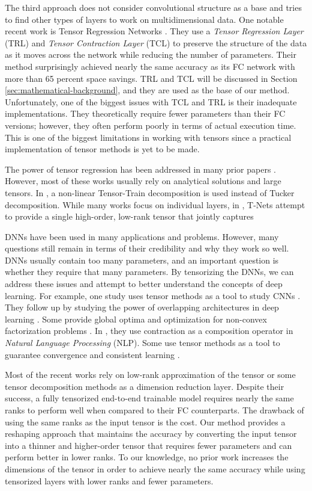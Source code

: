 \documentclass{article}
\begin{document}
The third approach does not consider convolutional structure as a base and tries to find other types of layers to work on multidimensional data. One notable recent work is Tensor Regression Networks \cite{r1}. They use a \textit{Tensor Regression Layer} (TRL) and \textit{Tensor Contraction Layer} (TCL) to preserve the structure of the data as it moves across the network while reducing the number of parameters. Their method surprisingly achieved nearly the same accuracy as its FC network with more than 65 percent space savings. TRL and TCL will be discussed in Section \ref{sec:mathematical-background}, and they are used as the base of our method. Unfortunately, one of the biggest issues with TCL and TRL is their inadequate implementations. They theoretically require fewer parameters than their FC versions; however, they often perform poorly in terms of actual execution time. This is one of the biggest limitations in working with tensors since a practical implementation of tensor methods is yet to be made.

The power of tensor regression has been addressed in many prior papers \cite{r17, r18, r19, r20}. However, most of these works usually rely on analytical solutions and large tensors. In \cite{r33}, a non-linear Tensor-Train decomposition is used instead of Tucker decomposition. While many works focus on individual layers, in \cite{r34}, T-Nets attempt to provide a single high-order, low-rank tensor that jointly captures

DNNs have been used in many applications and problems. However, many questions still remain in terms of their credibility and why they work so well. DNNs usually contain too many parameters, and an important question is whether they require that many parameters. By tensorizing the DNNs, we can address these issues and attempt to better understand the concepts of deep learning. For example, one study uses tensor methods as a tool to study CNNs \cite{r12}. They follow up by studying the power of overlapping architectures in deep learning \cite{r13}. Some provide global optima and optimization for non-convex factorization problems \cite{r14}. In \cite{r15}, they use contraction as a composition operator in \textit{Natural Language Processing} (NLP). Some use tensor methods as a tool to guarantee convergence and consistent learning \cite{r16}.

Most of the recent works rely on low-rank approximation of the tensor or some tensor decomposition methods as a dimension reduction layer. Despite their success, a fully tensorized end-to-end trainable model requires nearly the same ranks to perform well when compared to their FC counterparts. The drawback of using the same ranks as the input tensor is the cost. Our method provides a reshaping approach that maintains the accuracy by converting the input tensor into a thinner and higher-order tensor that requires fewer parameters and can perform better in lower ranks. To our knowledge, no prior work increases the dimensions of the tensor in order to achieve nearly the same accuracy while using tensorized layers with lower ranks and fewer parameters.
\end{document}
